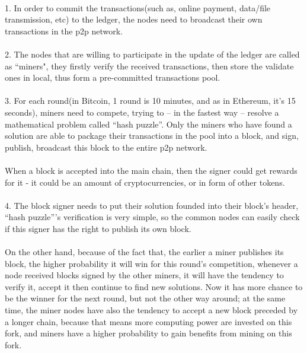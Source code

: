 \documentclass[doublespacing]{bmcart}
\begin{document}
\begin{CJK*}{UTF8}{gbsn}
	\paragraph{}    
    1. In order to commit the transactions(such as, online payment, data/file transmission, etc) to the ledger, the nodes need to broadcast their own transactions in the p2p network.
    \paragraph{}
    2. The nodes that are willing to participate in the update of the ledger are called as ``miners", they firstly verify the received transactions, then store the validate ones in local, thus form a pre-committed transactions pool.
    \paragraph{}
    3. For each round(in Bitcoin, 1 round is 10 minutes, and as in Ethereum, it’s 15 seconds), miners need to compete, trying to – in the fastest way – resolve a mathematical problem called “hash puzzle”. Only the miners who have found a solution are able to package their transactions in the pool into a block, and sign, publish, broadcast this block to the entire p2p network.
    \paragraph{} 
     When a block is accepted into the main chain, then the signer could get rewards for it -  it could be an amount of cryptocurrencies, or in form of other tokens.
    \paragraph{}    
    4. The block signer needs to put their solution founded into their block’s header, “hash puzzle”’s verification is very simple, so the common nodes can easily check if this signer has the right to publish its own block.
    \paragraph{}
    On the other hand, because of the fact that, the earlier a miner publishes its block, the higher probability it will win for this round’s competition, whenever a node received blocks signed by the other miners, it will have the tendency to verify it, accept it then continue to find new solutions. Now it has more chance to be the winner for the next round, but not the other way around; at the same time, the miner nodes have also the tendency to accept a new block preceded by a longer chain, because that means more computing power are invested on this fork, and miners have a higher probability to gain benefits from mining on this fork.

\end{CJK*}
\end{document}
